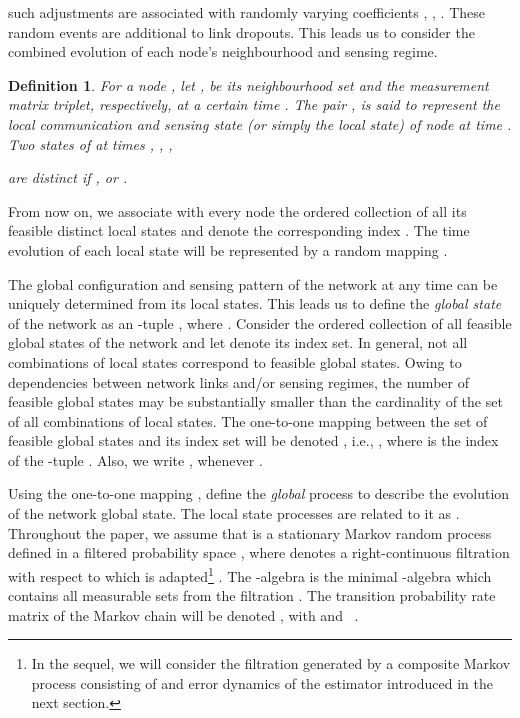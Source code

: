 \documentclass[a4paper,twocolumn]{autart}
\newtheorem{definition}{Definition}
\begin{document}
such adjustments are associated with randomly varying coefficients ,
, . These random events are additional
to link dropouts.  This leads us to consider the combined evolution of each
node's neighbourhood and sensing regime.   

\begin{definition}\label{Distinct.N}
For a node , let ,  be its neighbourhood set and the measurement matrix 
triplet, respectively,
at a certain time .  The pair , is said to represent the \emph{local
communication and sensing state} (or simply the \emph{local state}) of node 
 at time . Two states of  at times , , 
, 

are distinct if\/
, or
.
\end{definition}
From now on, we associate with every node  the ordered collection of all
its feasible distinct local states and denote the
corresponding index .
The time evolution of each local state will be represented by a random mapping
.     

The global configuration and sensing pattern of the network at
any time can be uniquely determined from its local states. This leads us to
define the \emph{global state} of the network as an -tuple
, where . 
Consider the ordered collection of all feasible global states of the
network and let  denote its 
index set.  In general, not all
combinations of local states correspond to feasible global states. Owing to
dependencies between network links and/or sensing regimes, the number of
feasible global states may be substantially smaller than the cardinality of
the set  of all
combinations of local states. The one-to-one mapping between
the set of feasible global states  
 and its index set  will be denoted
, i.e., , where  is the index of the
-tuple  .  Also, we write
, whenever . 

Using the one-to-one mapping , define the \emph{global} process 
 to describe the evolution
of the network global state. 
The local state processes  are related to it as
 .  Throughout the paper, we
assume that
 is a stationary Markov random process  defined in a
filtered probability space , where  denotes a 
right-continuous filtration with 
respect to which  is adapted\footnote{In the sequel,
  we will consider the
  filtration generated by a composite Markov process consisting of
   and error dynamics of the estimator introduced in the next section.}   
  \cite{BC-2009}. 
The -algebra  is the minimal
-algebra which contains all measurable sets from the filtration
. 
The transition probability rate matrix of the Markov chain  will be denoted , with
 and ~\cite{BC-2009}.  
\end{document}
